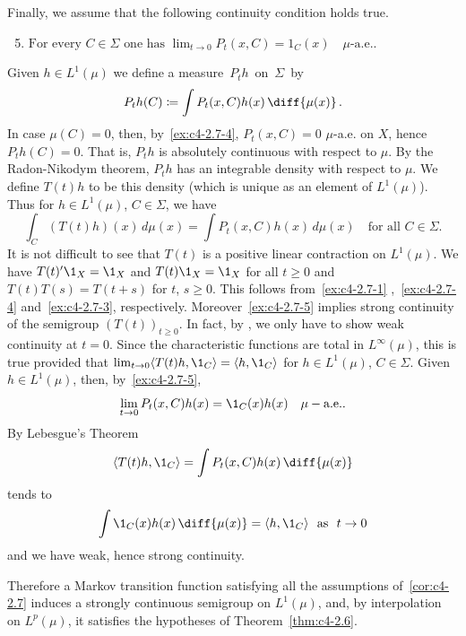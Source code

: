\begin{example}
Finally, we assume that the following continuity condition holds true.
\begin{enumerate}[\upshape (i)]
\setcounter{enumi}{4}
\item \label{ex:c4-2.7-5}
$\text{For every } C \in \Sigma \text{ one has } \lim_{t \to 0} P_{t}(x,C) = 1_{C}(x) \quad \mu\text{-a.e.}.$
\end{enumerate}
Given $h \in L^{1}(\mu)$ we define a measure\, $P_{t}h$\, on\, $\Sigma$\, by
\[
P_{t}h(C) \coloneqq \int P_{t}(x,C)h(x) \, \diff{\mu(x)}\,.
\]
In case $\mu(C) = 0$, then, by~\ref{ex:c4-2.7-4}, $P_{t}(x,C) = 0$ $\mu$-a.e. on $X$, hence $P_{t}h(C) = 0$.
That is, $P_{t}h$ is absolutely continuous with respect to $\mu$.
By the Radon-Nikodym theorem, $P_{t}h$ has an integrable density with respect to $\mu$.
We define $T(t)h$ to be this density (which is unique as an element of\/ $L^{1}(\mu)$).
Thus for $h \in L^{1}(\mu)$, $C \in \Sigma$, we have
\begin{equation}\label{eq:c4-2.8}
\int_{C}(T(t)h)(x) \, d\mu(x) = \int P_{t}(x,C)h(x) \, d\mu(x) \quad \text{for all } C \in \Sigma.
\end{equation}
It is not difficult to see that $T(t)$ is a positive linear contraction on $L^{1}(\mu)$.
We have $T(t)'\1_{X} = \1_{X}$ and $T(t)\1_{X} = \1_{X}$ for all $t \geq 0$ and $T(t)T(s) = T(t+s)$ for $t$, $s \geq 0$.
This follows from~\ref{ex:c4-2.7-1} ,~\ref{ex:c4-2.7-4} and~\ref{ex:c4-2.7-3}, respectively.
Moreover~\ref{ex:c4-2.7-5} implies strong continuity of the semigroup $(T(t))_{t \geq 0}$.
In fact, by \textcite[Proposition 1.23]{davies:1980}, we only have to show weak continuity at $t = 0$.
Since the characteristic functions are total in $L^{\infty}(\mu)$, this is true provided that $\lim_{t \to 0} \langle T(t)h,\1_{C}\rangle = \langle h,\1_{C}\rangle$ for $h \in L^{1}(\mu)$, $C \in \Sigma$.
Given $h \in L^{1}(\mu)$, then, by~\ref{ex:c4-2.7-5}, 
\[
\lim_{t \to 0} P_{t}(x,C)h(x) = \1_{C}(x)h(x)\quad\mu-\text{a.e.}.
\]
By Lebesgue's Theorem 
\[
\langle T(t)h,\1_{C}\rangle = \int P_{t}(x,C)h(x) \, \diff{\mu(x)}
\]
tends to 
\[
\int \1_{C}(x)h(x) \, \diff{\mu(x)} = \langle h,\1_{C}\rangle \ \text{ as } \ t \to 0
\]
and we have weak, hence strong continuity.

Therefore a Markov transition function satisfying all the assumptions of~\ref{cor:c4-2.7} induces a strongly continuous semigroup on $L^{1}(\mu)$, and, by interpolation on $L^{p}(\mu)$, it satisfies the hypotheses of Theorem~\ref{thm:c4-2.6}.
\end{example}


